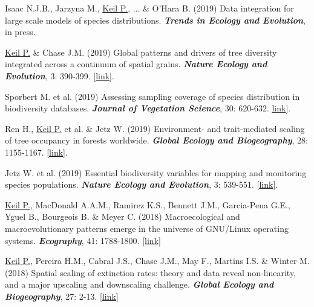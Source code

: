 \begin{etaremune}

\item Isaac N.J.B., Jarzyna M., \underline{Keil P.}, ... \& O'Hara B. (2019) Data integration for large scale models of species distributions. \textit{\textbf{Trends in Ecology and Evolution}}, in press.

\item \underline{Keil P.} \& Chase J.M. (2019) Global patterns and drivers of tree diversity integrated across a continuum of spatial grains. \textit{\textbf{Nature Ecology and Evolution}}, 3: 390-399. [\href{https://www.nature.com/articles/s41559-019-0799-0}{link}].

\item Sporbert M. et al. (2019) Assessing sampling coverage of species distribution in biodiversity databases. \textit{\textbf{Journal of Vegetation Science}}, 30: 620-632. \href{https://onlinelibrary.wiley.com/doi/full/10.1111/jvs.12763}{link}].

\item Ren H., \underline{Keil P.} et al. \& Jetz W. (2019) Environment- and trait-mediated scaling of tree occupancy in forests worldwide. \textit{\textbf{Global Ecology and Biogeography}}, 28: 1155-1167. [\href{https://onlinelibrary.wiley.com/doi/full/10.1111/geb.12922}{link}].

\item Jetz W. et al. (2019) Essential biodiversity variables for mapping and monitoring species populations. \textit{\textbf{Nature Ecology and Evolution}}, 3: 539-551. [\href{https://www.nature.com/articles/s41559-019-0826-1}{link}].

\item \underline{Keil P.}, MacDonald A.A.M., Ramirez K.S., Bennett J.M., Garcia-Pena G.E., Yguel B., Bourgeois B. \& Meyer C. (2018)  Macroecological and macroevolutionary patterns emerge in the universe of GNU/Linux operating systems. \textit{\textbf{Ecography}}, 41: 1788-1800. [\href{https://onlinelibrary.wiley.com/doi/full/10.1111/ecog.03424}{link}]

\item \underline{Keil P.}, Pereira H.M., Cabral J.S., Chase J.M., May F., Martins I.S. \& Winter M. (2018) Spatial scaling of extinction rates: theory and data reveal non-linearity, and a major upscaling and downscaling challenge. \textit{\textbf{Global Ecology and Biogeography}}, 27: 2-13. [\href{http://onlinelibrary.wiley.com/doi/10.1111/geb.12669/abstract}{link}]


\end{etaremune}
